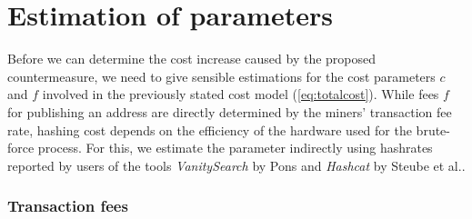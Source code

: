 \documentclass[a4paper,11pt,titlepage]{scrbook}
\begin{document}
\section{Estimation of parameters}\label{sec:parameters}



Before we can determine the cost increase caused by the proposed countermeasure, we need to give sensible estimations for the cost parameters $c$ and $f$ involved in the previously stated cost model (\ref{eq:totalcost}).
While fees $f$ for publishing an address are directly determined by the miners' transaction fee rate, hashing cost depends on the efficiency of the hardware used for the brute-force process.
For this, we estimate the parameter indirectly using hashrates reported by users of the tools \emph{VanitySearch} by Pons \cite{vanitysearch_2019} and \emph{Hashcat} by Steube et al.\@ \cite{hashcat_2020}.

\subsubsection*{Transaction fees}
\end{document}
